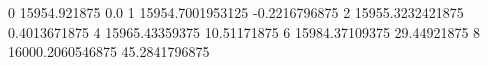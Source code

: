 0 15954.921875 0.0
1 15954.7001953125 -0.2216796875
2 15955.3232421875 0.4013671875
4 15965.43359375 10.51171875
6 15984.37109375 29.44921875
8 16000.2060546875 45.2841796875
